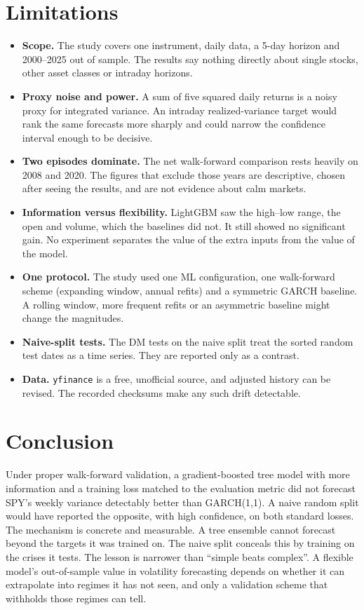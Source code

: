 \documentclass[11pt]{article}
\providecommand{\tightlist}{\setlength{\itemsep}{0pt}\setlength{\parskip}{0pt}}
\begin{document}
\hypertarget{limitations}{%
\section{Limitations}\label{limitations}}

\begin{itemize}
\tightlist
\item
  \textbf{Scope.} The study covers one instrument, daily data, a 5-day horizon
  and 2000--2025 out of sample. The results say nothing directly about
  single stocks, other asset classes or intraday horizons.
\item
  \textbf{Proxy noise and power.} A sum of five squared daily returns is a
  noisy proxy for integrated variance. An intraday realized-variance
  target would rank the same forecasts more sharply and could narrow the
  confidence interval enough to be decisive.
\item
  \textbf{Two episodes dominate.} The net walk-forward comparison rests
  heavily on 2008 and 2020. The figures that exclude those years are
  descriptive, chosen after seeing the results, and are not evidence about
  calm markets.
\item
  \textbf{Information versus flexibility.} LightGBM saw the high--low range, the
  open and volume, which the baselines did not. It still showed no
  significant gain. No experiment separates the value of the extra inputs
  from the value of the model.
\item
  \textbf{One protocol.} The study used one ML configuration, one walk-forward
  scheme (expanding window, annual refits) and a symmetric GARCH baseline.
  A rolling window, more frequent refits or an asymmetric baseline might
  change the magnitudes.
\item
  \textbf{Naive-split tests.} The DM tests on the naive split treat the sorted
  random test dates as a time series. They are reported only as a
  contrast.
\item
  \textbf{Data.} \texttt{yfinance} is a free, unofficial source, and adjusted history
  can be revised. The recorded checksums make any such drift detectable.
\end{itemize}

\hypertarget{conclusion}{%
\section{Conclusion}\label{conclusion}}

Under proper walk-forward validation, a gradient-boosted tree model with
more information and a training loss matched to the evaluation metric did
not forecast SPY's weekly variance detectably better than GARCH(1,1). A
naive random split would have reported the opposite, with high confidence,
on both standard losses. The mechanism is concrete and measurable. A tree
ensemble cannot forecast beyond the targets it was trained on. The naive
split conceals this by training on the crises it tests. The lesson is
narrower than ``simple beats complex''. A flexible model's out-of-sample
value in volatility forecasting depends on whether it can extrapolate into
regimes it has not seen, and only a validation scheme that withholds those
regimes can tell.
\end{document}
